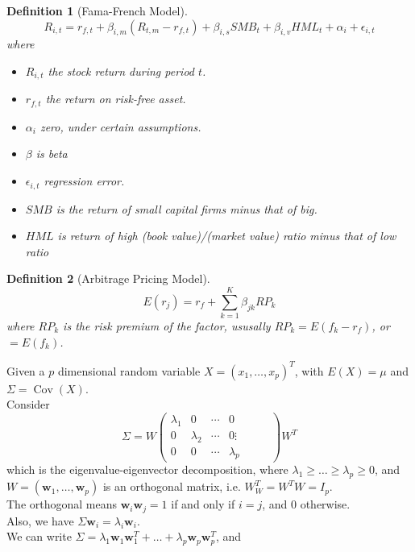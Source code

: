 \documentclass[11pt]{article}
\newtheorem{definition}{Definition}[section]
\theoremstyle{definition}
\DeclareMathOperator{\cov}{Cov}
\begin{document}
\begin{definition}[Fama-French Model]
\normalfont 
\[
R_{i,t} = r_{f,t} + \beta_{i,m}(R_{t,m}-r_{f,t})+\beta_{i,s}SMB_t + \beta_{i,v}HML_t + \alpha_i + \epsilon_{i,t}
\]
where
\begin{itemize}
  \item $R_{i,t}$ the stock return during period $t$.
  \item $r_{f,t}$ the return on risk-free asset.
  \item $\alpha_i$ zero, under certain assumptions.
  \item $\beta$ is beta
  \item $\epsilon_{i,t}$ regression error.
  \item $SMB$ is the return of small capital firms minus that of big.
  \item $HML$ is return of high (book value)/(market value) ratio minus that of low ratio
\end{itemize}
\end{definition}
\begin{definition}[Arbitrage Pricing Model]
\normalfont
\[
E(r_j) = r_f + \sum_{k=1}^K \beta_{jk}RP_k
\]
where $RP_k$ is the risk premium of the factor, ususally $RP_k=E(f_k-r_f)$, or $=E(f_k)$.
\end{definition}
Given a $p$ dimensional random variable $X=(x_1,\ldots, x_p)^T$, with $E(X)=\mu$ and $\Sigma=\cov(X)$.\\
Consider 
\[
\Sigma=W\begin{pmatrix}\lambda_1 & 0 & \cdots & 0 \\ 0 & \lambda_2 & \cdots & 0 \vdots &&& \\ 0 & 0 & \cdots &\lambda_p\end{pmatrix} W^T
\]
which is the eigenvalue-eigenvector decomposition, where $\lambda_1\geq \ldots\geq \lambda_p\geq 0$, and $W=(\mathbf{w}_1,\ldots, \mathbf{w}_p)$ is an orthogonal matrix, i.e. $W_W^T = W^TW=I_p$.\\
The orthogonal means $\mathbf{w}_i\mathbf{w}_j = 1$ if and only if $i=j$, and $0$ otherwise.\\
Also, we have $\Sigma \mathbf{w}_i = \lambda_i\mathbf{w}_i$.\\
We can write $\Sigma = \lambda_1 \mathbf{w}_1\mathbf{w}_1^T + \ldots + \lambda_p \mathbf{w}_p\mathbf{w}_p^T$, and
\end{document}
